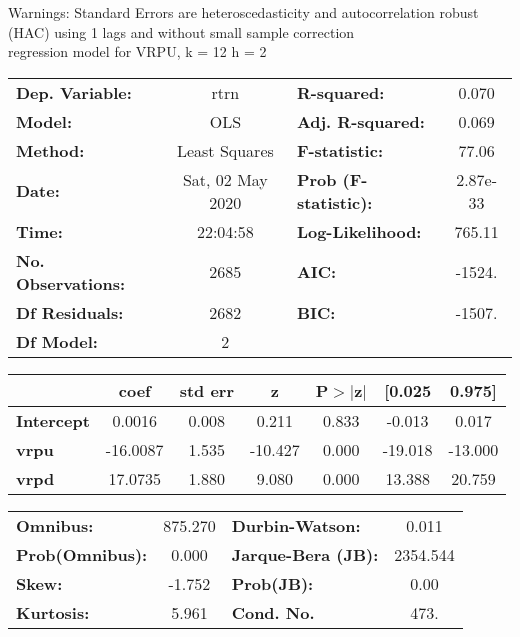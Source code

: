 Warnings: \newline
 [1] Standard Errors are heteroscedasticity and autocorrelation robust (HAC) using 1 lags and without small sample correction\\ 

regression model for VRPU, k = 12 h = 2\begin{center}
\begin{tabular}{lclc}
\toprule
\textbf{Dep. Variable:}    &       rtrn       & \textbf{  R-squared:         } &     0.070   \\
\textbf{Model:}            &       OLS        & \textbf{  Adj. R-squared:    } &     0.069   \\
\textbf{Method:}           &  Least Squares   & \textbf{  F-statistic:       } &     77.06   \\
\textbf{Date:}             & Sat, 02 May 2020 & \textbf{  Prob (F-statistic):} &  2.87e-33   \\
\textbf{Time:}             &     22:04:58     & \textbf{  Log-Likelihood:    } &    765.11   \\
\textbf{No. Observations:} &        2685      & \textbf{  AIC:               } &    -1524.   \\
\textbf{Df Residuals:}     &        2682      & \textbf{  BIC:               } &    -1507.   \\
\textbf{Df Model:}         &           2      & \textbf{                     } &             \\
\bottomrule
\end{tabular}
\begin{tabular}{lcccccc}
                   & \textbf{coef} & \textbf{std err} & \textbf{z} & \textbf{P$> |$z$|$} & \textbf{[0.025} & \textbf{0.975]}  \\
\midrule
\textbf{Intercept} &       0.0016  &        0.008     &     0.211  &         0.833        &       -0.013    &        0.017     \\
\textbf{vrpu}      &     -16.0087  &        1.535     &   -10.427  &         0.000        &      -19.018    &      -13.000     \\
\textbf{vrpd}      &      17.0735  &        1.880     &     9.080  &         0.000        &       13.388    &       20.759     \\
\bottomrule
\end{tabular}
\begin{tabular}{lclc}
\textbf{Omnibus:}       & 875.270 & \textbf{  Durbin-Watson:     } &    0.011  \\
\textbf{Prob(Omnibus):} &   0.000 & \textbf{  Jarque-Bera (JB):  } & 2354.544  \\
\textbf{Skew:}          &  -1.752 & \textbf{  Prob(JB):          } &     0.00  \\
\textbf{Kurtosis:}      &   5.961 & \textbf{  Cond. No.          } &     473.  \\
\bottomrule
\end{tabular}
\end{center}

